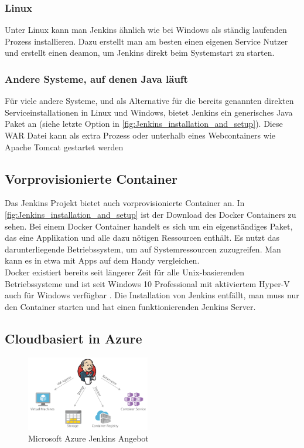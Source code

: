 \subsubsection*{Linux}
Unter Linux kann man Jenkins ähnlich wie bei Windows als ständig laufenden Prozess installieren. Dazu erstellt man am besten einen eigenen Service Nutzer  und erstellt einen deamon, um Jenkins direkt beim Systemstart zu starten. \cite{jenkins-installing}
\subsubsection*{Andere Systeme, auf denen Java läuft}
Für viele andere Systeme, und als Alternative für die bereits genannten direkten Serviceinstallationen in Linux und Windows, bietet Jenkins ein generisches Java Paket an (siehe letzte Option in \autoref{fig:Jenkins_installation_and_setup}). Diese WAR Datei kann als extra Prozess oder unterhalb eines Webcontainers wie Apache Tomcat gestartet werden \cite{jenkins-installing}
\subsection{Vorprovisionierte Container}
Das Jenkins Projekt bietet auch vorprovisionierte Container an. In \autoref{fig:Jenkins_installation_and_setup} ist der Download des Docker Containers zu sehen. Bei einem Docker Container handelt es sich um ein eigenständiges Paket, das eine Applikation und alle dazu nötigen Ressourcen enthält. Es nutzt das darunterliegende Betriebssystem, um auf Systemressourcen zuzugreifen. Man kann es in etwa mit Apps auf dem Handy vergleichen.\\
Docker existiert bereits seit längerer Zeit für alle Unix-basierenden Betriebssysteme und ist seit Windows 10 Professional mit aktiviertem Hyper-V auch für Windows verfügbar \cite{Docker-Win10}. Die Installation von Jenkins entfällt, man muss nur den Container starten und hat einen funktionierenden Jenkins Server.
\subsection{Cloudbasiert in Azure}
\begin{figure}
  \begin{center}
    \includegraphics[width=0.48\textwidth]{./Images/Screenshot1.png}
  \end{center}
  \caption{Microsoft Azure Jenkins Angebot\cite{jenkins-azure}}\label{fig:Screenshot1}
\end{figure}

